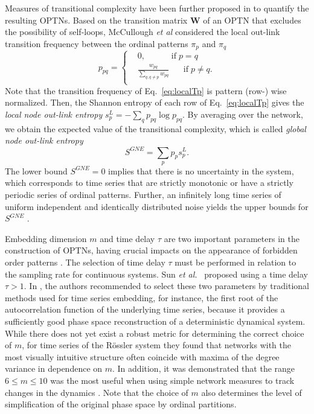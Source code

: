 		Measures of transitional complexity have been further proposed in \cite{McCullough2017b} to quantify the resulting OPTNs. Based on the transition matrix $\mathbf{W}$ of an OPTN that excludes the possibility of self-loops, McCullough {\textit{et al}} \cite{McCullough2017b} considered the local out-link transition frequency between the ordinal patterns $\pi_p$ and $\pi_q$
		\begin{equation} \label{eq:localTp}
			p_{pq} = \left \{ \begin{aligned}
							& 0,  \;\;\;\;\;\;\;\;\;\;\; \text{if} \; p = q\\
							& \frac{w_{pq}}{\sum_{q, q \neq p} w_{pq}} \;\;\;\;\;\; \text{if} \; p \neq q.\\
							\end{aligned}
					    \right.
		\end{equation}
		Note that the transition frequency of Eq.~\eqref{eq:localTp} is pattern (row-) wise normalized. Then, the Shannon entropy of each row of Eq.~\eqref{eq:localTp} gives the \emph{local node out-link entropy} $s_{p}^{L} = -\sum_{q} p_{pq} \log p_{pq}$. By averaging over the network, we obtain the expected value of the transitional complexity, which is called \emph{global node out-link entropy} 
		\begin{equation}\label{eq:globalTp}
			S^{GNE} = \sum_{p} p_p s_{p}^{L}. 
		\end{equation}
		The lower bound $S^{GNE} = 0$ implies that there is no uncertainty in the system, which corresponds to time series that are strictly monotonic or have a strictly periodic series of ordinal patterns. Further, an infinitely long time series of uniform independent and identically distributed noise yields the upper bounds for $S^{GNE}$ \cite{McCullough2017b}. 
		
		Embedding dimension $m$ and time delay $\tau$ are two important parameters in the construction of OPTNs, having crucial impacts on the appearance of forbidden order patterns \cite{Kulp2016b,McCullough2016,Sakellariou2016}. The selection of time delay $\tau$ must be performed in relation to the sampling rate for continuous systems. Sun \emph{et al.}~\cite{Sun2014} proposed using a time delay $\tau > 1$. In \cite{McCullough2015}, the authors recommended to select these two parameters by traditional methods used for time series embedding, for instance, the first root of the autocorrelation function of the underlying time series, because it provides a sufficiently good phase space reconstruction of a deterministic dynamical system. While there does not yet exist a robust metric for determining the correct choice of $m$, for time series of the R\"ossler system they found that networks with the most visually intuitive structure often coincide with maxima of the degree variance in dependence on $m$. In addition, it was demonstrated that the range $6 \leq m \leq 10$ was the most useful when using simple network measures to track changes in the dynamics \cite{McCullough2015}. Note that the choice of $m$ also determines the level of simplification of the original phase space by ordinal partitions. 
		
